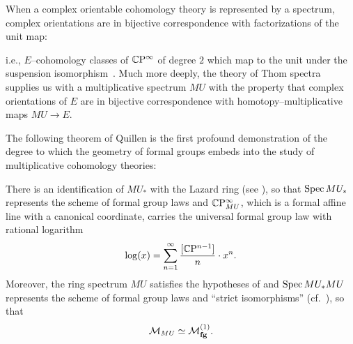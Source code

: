 \begin{remark}
When a complex orientable cohomology theory is represented by a spectrum, complex orientations are in bijective correspondence with factorizations of the unit map:
\begin{center}
\end{center}
i.e., $E$--cohomology classes of $\mathbb{C}\mathrm P^\infty$ of degree $2$ which map to the unit under the suspension isomorphism~\cite[Lemma I.4.6]{AdamsBlueBook}.  Much more deeply, the theory of Thom spectra supplies us with a multiplicative spectrum $MU$ with the property that complex orientations of $E$ are in bijective correspondence with homotopy--multiplicative maps $MU \to E$.
\end{remark}

The following theorem of Quillen is the first profound demonstration of the degree to which the geometry of formal groups embeds into the study of multiplicative cohomology theories:

\begin{theorem}\label{QuillensTheorem}
There is an identification of $MU_*$ with the Lazard ring (see ), so that $\operatorname{Spec} MU_*$ represents the scheme of formal group laws and $\mathbb{C}\mathrm P^\infty_{MU}$, which is a formal affine line with a canonical coordinate, carries the universal formal group law with rational logarithm \[\log(x) = \sum_{n=1}^\infty \frac{[\mathbb{C}\mathrm P^{n-1}]}{n} \cdot x^n.\]  Moreover, the ring spectrum $MU$ satisfies the hypotheses of  and $\operatorname{Spec} MU_* MU$ represents the scheme of formal group laws and ``strict isomorphisms'' (cf.\ ), so that \[\mathcal{M}_{MU} \simeq \mathcal{M}_{\mathbf{fg}}^{(1)}.\]
\end{theorem}

